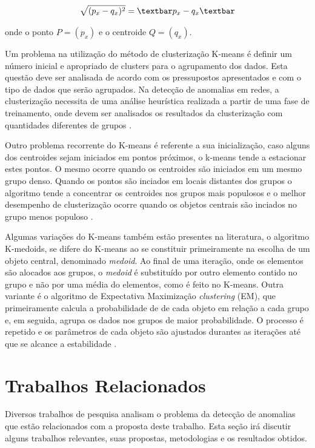 \begin{equation}
\label{eq:Distância Euclidiana} %
\sqrt{(p_{x} - q_{x})^{2}} = \textbar p_{x} - q_{x} \textbar
\end{equation}

\noindent onde o ponto $P = (p_{x})$ e o centroide $Q = (q_{x})$.

\indent Um problema na utilização do método de clusterização K-means é definir um número inicial e  apropriado de clusters para o agrupamento dos dados. Esta questão deve ser analisada de acordo com os pressupostos apresentados e com o tipo de dados que serão agrupados. Na detecção de anomalias em redes, a clusterização necessita de uma análise heurística realizada a partir de uma fase de treinamento, onde devem ser analisados os resultados da clusterização com quantidades diferentes de grupos \cite{munz2007}.

\indent Outro problema recorrente do K-means é referente a sua inicialização, caso alguns dos centroides sejam iniciados em pontos próximos, o k-means tende a estacionar estes pontos. O mesmo ocorre quando os centroides são iniciados em um mesmo grupo denso. Quando os pontos são inciados em locais distantes dos grupos o algoritmo tende a concentrar os centroides nos grupos mais populosos e o melhor desempenho de clusterização ocorre quando os objetos centrais são inciados no grupo menos populoso \cite{adaniya2012}.

\indent Algumas variações do K-means também estão presentes na literatura, o algoritmo K-medoids, se difere do K-means ao se constituir primeiramente na escolha de um objeto central, denominado \textit{medoid}. Ao final de uma iteração, onde os elementos são alocados aos grupos, o \textit{medoid} é substituído por outro elemento contido no grupo e não por uma média do elementos, como é feito no K-means. Outra variante é o algoritmo de Expectativa Maximização \textit{clustering} (EM), que primeiramente calcula a probabilidade de de cada objeto em relação a cada grupo e, em seguida, agrupa os dados nos grupos de maior probabilidade. O processo é repetido e os parâmetros de cada objeto são ajustados durantes as iterações até que se alcance a estabilidade \cite{Syarif2012}.

  \section{Trabalhos Relacionados}

\indent Diversos trabalhos de pesquisa analisam o problema da detecção de anomalias que estão relacionados com a proposta deste trabalho. Esta seção irá discutir alguns trabalhos relevantes, suas propostas, metodologias e os resultados obtidos.


